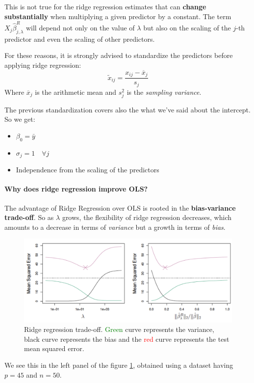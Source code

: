 This is not true for the ridge regression estimates that can \textbf{change substantially} when multiplying a given predictor by a constant. The term $X_j \hat{\beta}_{j,\lambda}^R$ will depend not only on the value of $\lambda$ but also on the scaling of the $j$-th predictor and even the scaling of other predictors.

For these reasons, it is strongly advised to standardize the predictors before applying ridge regression:
\[
    \tilde{x}_{ij} = \frac{x_{ij} - \overline{x}_j}{s_j}
\]
Where $\overline{x}_j$ is the arithmetic mean and $s_j^2$ is the \textit{sampling variance}.

The previous standardization covers also the what we've said about the intercept. So we get:
\begin{itemize}
    \item $\beta_0 = \bar{y}$
    \item $\sigma_j = 1 \quad \forall j$
    \item Independence from the scaling of the predictors
\end{itemize}

\paragraph*{Why does ridge regression improve OLS?}
The advantage of Ridge Regression over OLS is rooted in the \textbf{bias-variance trade-off}. So as $\lambda$ grows, the flexibility of ridge regression decreases, which amounts to a decrease in terms of \textit{variance} but a growth in terms of \textit{bias}.

\begin{figure}
    \centering
    \includegraphics[width=0.8\linewidth]{./figures/chapter_4/ridgetradeoff.png}
    \caption{Ridge regression trade-off. \textcolor{green}{Green} curve represents the variance, black curve represents the bias and the \textcolor{red}{red} curve represents the test mean squared error.}
    \label{fig:ridgetradeoff}
\end{figure}

We see this in the left panel of the figure \ref{fig:ridgetradeoff}, obtained using a dataset having $p=45$ and $n=50$.


